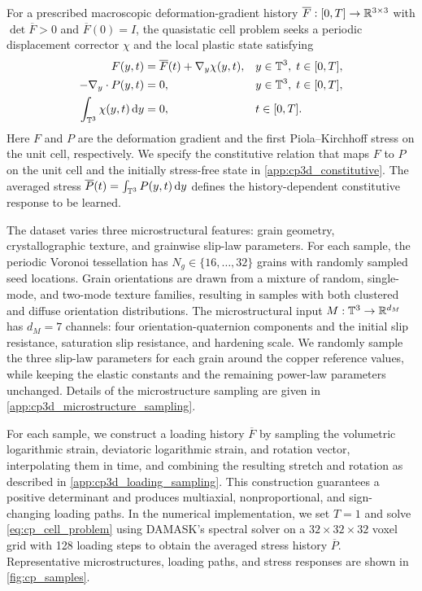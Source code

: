 \documentclass[3p, 12pt, preprint]{elsarticle}
\begin{document}
{\color{blue}
For a prescribed macroscopic deformation-gradient history $\overline F:[0,T]\to\mathbb{R}^{3\times3}$ with $\det\overline F>0$ and $\overline F(0)=I$, the quasistatic cell problem seeks a periodic displacement corrector $\chi$ and the local plastic state satisfying
\begin{subequations}\label{eq:cp_cell_problem}
\begin{align}
    F(y,t) &= \overline F(t)+\nabla_y\chi(y,t), && y\in\mathbb{T}^3,\; t\in[0,T],\\
    -\nabla_y \cdot P(y,t) &= 0, && y\in\mathbb{T}^3,\; t\in[0,T],\\
    \int_{\mathbb{T}^3}\chi(y,t)\,\mathrm{d}y &= 0, && t\in[0,T].
\end{align}
\end{subequations}
Here $F$ and $P$ are the deformation gradient and the first Piola--Kirchhoff stress on the unit cell, respectively. We specify the constitutive relation that maps $F$ to $P$ on the unit cell and the initially stress-free state in \cref{app:cp3d_constitutive}. The averaged stress $\overline P(t) = \int_{\mathbb{T}^3}P(y,t)\,\mathrm{d}y$ defines the history-dependent constitutive response to be learned.
}

The dataset varies three microstructural features: grain geometry, crystallographic texture, and grainwise slip-law parameters. For each sample, the periodic Voronoi tessellation has $N_g\in\{16,\dots,32\}$ grains with randomly sampled seed locations. Grain orientations are drawn from a mixture of random, single-mode, and two-mode texture families, resulting in samples with both clustered and diffuse orientation distributions. The microstructural input $M:\mathbb{T}^3\to\mathbb{R}^{d_M}$ has $d_M=7$ channels: four orientation-quaternion components and the initial slip resistance, saturation slip resistance, and hardening scale. We randomly sample the three slip-law parameters for each grain around the copper reference values, while keeping the elastic constants and the remaining power-law parameters unchanged. Details of the microstructure sampling are given in \cref{app:cp3d_microstructure_sampling}.

For each sample, we construct a loading history $\overline F$ by sampling the volumetric logarithmic strain, deviatoric logarithmic strain, and rotation vector, interpolating them in time, and combining the resulting stretch and rotation as described in \cref{app:cp3d_loading_sampling}. This construction guarantees a positive determinant and produces multiaxial, nonproportional, and sign-changing loading paths. {\color{blue}In the numerical implementation, we set $T=1$ and solve \cref{eq:cp_cell_problem}} using DAMASK's spectral solver on a $32\times32\times32$ voxel grid with 128 loading steps to obtain the averaged stress history $\overline P$. Representative microstructures, loading paths, and stress responses are shown in \cref{fig:cp_samples}.
\end{document}
